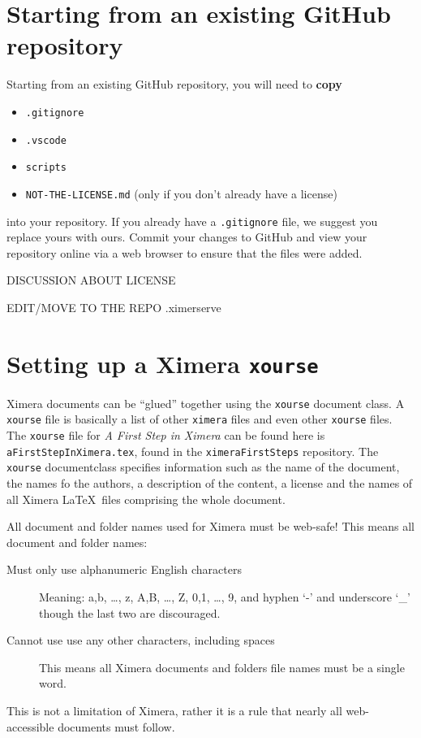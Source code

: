 \documentclass{ximera}
\begin{document}
\section{Starting from an existing GitHub repository}

Starting from an existing GitHub repository, you will need to \textbf{copy}
\begin{itemize}
  \item \texttt{.gitignore}
  \item \texttt{.vscode}
  \item \texttt{scripts}
  \item \texttt{NOT-THE-LICENSE.md} (only if you don't already have a license)
\end{itemize}
into your repository. If you already have a \verb|.gitignore| file, we suggest
you replace yours with ours. Commit your changes to GitHub and view your
repository online via a web browser to ensure that the files were added.

DISCUSSION ABOUT LICENSE

EDIT/MOVE TO THE REPO .ximerserve

\section{Setting up a Ximera \texttt{xourse}}

Ximera documents can be ``glued'' together using the \texttt{xourse} document
class.
A \verb|xourse| file is basically a list of other \verb|ximera| files and even
other \verb|xourse| files.
The \verb|xourse| file for \textit{A First Step in Ximera} can be found here is
\verb!aFirstStepInXimera.tex!, found in the \verb!ximeraFirstSteps! repository.
The \verb!xourse! documentclass specifies information such as the name of the
document, the names fo the authors, a description of the content, a license and
the names of all Ximera \LaTeX\ files comprising
the whole document.

\begin{warning}
  All document and folder names used for Ximera must be web-safe! This means
  all document and folder names:
  \begin{description}
    \item[Must only use alphanumeric English characters] Meaning: a,b, \dots,
      z, A,B, \dots, Z, 0,1, \dots, 9, and hyphen `-' and underscore `\_'
      though the
      last two are discouraged.
    \item[Cannot use use any other characters, including spaces] This means all
      Ximera documents and folders file names must be a single word.
  \end{description}
  This is not a limitation of Ximera, rather it is a rule that nearly all
  web-accessible documents must follow.
\end{warning}
\end{document}

